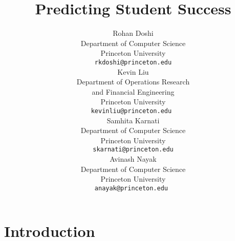 \documentclass{article} %
\title{Predicting Student Success}
\author{
Rohan Doshi\\
Department of Computer Science\\
Princeton University\\
\texttt{rkdoshi@princeton.edu} \\
\And
Kevin Liu  \\
Department of Operations Research \\ and Financial Engineering \\
Princeton University\\
\texttt{kevinliu@princeton.edu } \\
\And
Samhita Karnati \\
Department of Computer Science\\
Princeton University\\
\texttt{skarnati@princeton.edu} \\
\And
Avinash Nayak  \\
Department of Computer Science\\
Princeton University\\
\texttt{anayak@princeton.edu } \\
}
\begin{document}
\maketitle

\section{Introduction}


\end{document}
